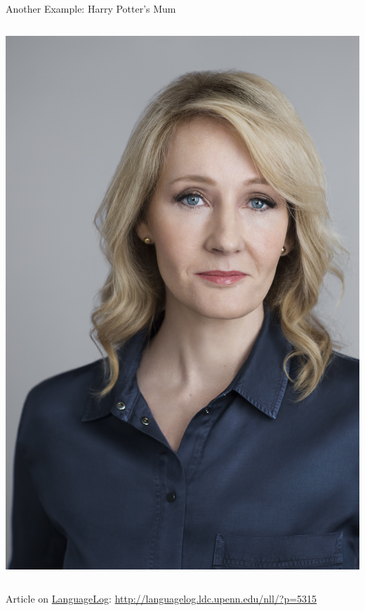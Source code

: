\documentclass[professionalfonts, xcolor={usenames,svgnames,x11names,table}]{beamer}
\begin{document}
\begin{frame}{Another Example: Harry Potter's Mum}
\begin{columns}
        \centering
        \includegraphics[width=1\linewidth]{./img/jkrowling}
    \end{columns}
    \begin{followup}
        Article on \href{http://languagelog.ldc.upenn.edu}{LanguageLog}: \url{http://languagelog.ldc.upenn.edu/nll/?p=5315}
    \end{followup}
\end{frame}
\end{document}
